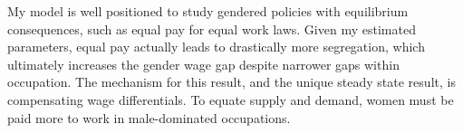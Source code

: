 \documentclass[12pt]{article}
\begin{document}






My model is well positioned to study gendered policies with equilibrium consequences, such as equal pay for equal work laws.  Given my estimated parameters, equal pay actually leads to drastically more segregation, which ultimately increases the gender wage gap despite narrower gaps within occupation. The mechanism for this result, and the unique steady state result, is compensating wage differentials. To equate supply and demand, women must be paid more to work in male-dominated occupations.
\end{document}
